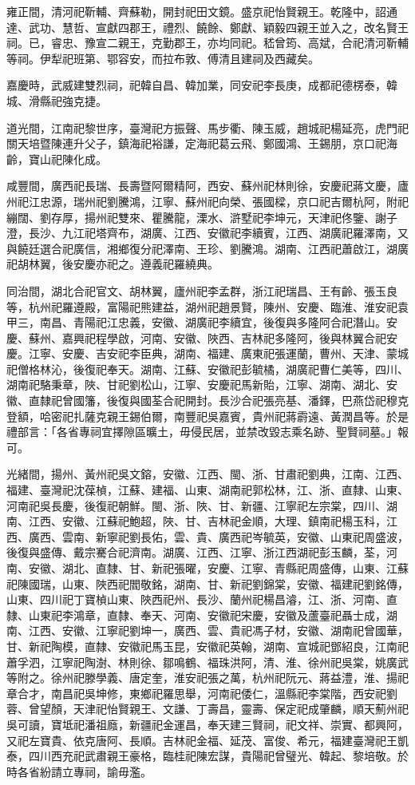 \begin{pinyinscope}
雍正間，清河祀靳輔、齊蘇勒，開封祀田文鏡。盛京祀怡賢親王。乾隆中，詔通達、武功、慧哲、宣獻四郡王，禮烈、饒餘、鄭獻、穎毅四親王並入之，改名賢王祠。已，睿忠、豫宣二親王，克勤郡王，亦均同祀。嵇曾筠、高斌，合祀清河靳輔等祠。伊犁祀班第、鄂容安，而拉布敦、傅清且建祠及西藏矣。

嘉慶時，武威建雙烈祠，祀韓自昌、韓加業，同安祀李長庚，成都祀德楞泰，韓城、滑縣祀強克捷。

道光間，江南祀黎世序，臺灣祀方振聲、馬步衢、陳玉威，趙城祀楊延亮，虎門祀關天培暨陳連升父子，鎮海祀裕謙，定海祀葛云飛、鄭國鴻、王錫朋，京口祀海齡，寶山祀陳化成。

咸豐間，廣西祀長瑞、長壽暨阿爾精阿，西安、蘇州祀林則徐，安慶祀蔣文慶，廬州祀江忠源，瑞州祀劉騰鴻，江寧、蘇州祀向榮、張國樑，京口祀吉爾杭阿，附祀繃闊、劉存厚，揚州祀雙來、瞿騰龍，溧水、滸墅祀李坤元，天津祀佟鑒、謝子澄，長沙、九江祀塔齊布，湖廣、江西、安徽祀李續賓，江西、湖廣祀羅澤南，又與饒廷選合祀廣信，湘鄉復分祀澤南、王珍、劉騰鴻。湖南、江西祀蕭啟江，湖廣祀胡林翼，後安慶亦祀之。遵義祀羅繞典。

同治間，湖北合祀官文、胡林翼，廬州祀李孟群，浙江祀瑞昌、王有齡、張玉良等，杭州祀羅遵殿，富陽祀熊建益，湖州祀趙景賢，陳州、安慶、臨淮、淮安祀袁甲三，南昌、青陽祀江忠義，安徽、湖廣祀李續宜，後復與多隆阿合祀潛山。安慶、蘇州、嘉興祀程學啟，河南、安徽、陜西、吉林祀多隆阿，後與林翼合祀安慶。江寧、安慶、吉安祀李臣典，湖南、福建、廣東祀張運蘭，曹州、天津、蒙城祀僧格林沁，後復祀奉天。湖南、江蘇、安徽祀彭毓橘，湖廣祀曹仁美等，四川、湖南祀駱秉章，陜、甘祀劉松山，江寧、安慶祀馬新貽，江寧、湖南、湖北、安徽、直隸祀曾國籓，後復與國荃合祀開封。長沙合祀張亮基、潘鐸，巴燕岱祀穆克登額，哈密祀扎薩克親王錫伯爾，南豐祀吳嘉賓，貴州祀蔣霨遠、黃潤昌等。於是禮部言：「各省專祠宜擇隙區曠土，毋侵民居，並禁改毀志乘名跡、聖賢祠墓。」報可。

光緒間，揚州、黃州祀吳文鎔，安徽、江西、閩、浙、甘肅祀劉典，江南、江西、福建、臺灣祀沈葆楨，江蘇、建福、山東、湖南祀郭松林，江、浙、直隸、山東、河南祀吳長慶，後復祀朝鮮。閩、浙、陜、甘、新疆、江寧祀左宗棠，四川、湖南、江西、安徽、江蘇祀鮑超，陜、甘、吉林祀金順，大理、鎮南祀楊玉科，江西、廣西、雲南、新寧祀劉長佑，雲、貴、廣西祀岑毓英，安徽、山東祀周盛波，後復與盛傳、戴宗騫合祀濟南。湖廣、江西、江寧、浙江西湖祀彭玉麟，荃，河南、安徽、湖北、直隸、甘、新祀張曜，安慶、江寧、青縣祀周盛傳，山東、江蘇祀陳國瑞，山東、陜西祀閻敬銘，湖南、甘、新祀劉錦棠，安徽、福建祀劉銘傳，山東、四川祀丁寶楨山東、陜西祀州、長沙、蘭州祀楊昌濬，江、浙、河南、直隸、山東祀李鴻章，直隸、奉天、河南、安徽祀宋慶，安徽及蘆臺祀聶士成，湖南、江西、安徽、江寧祀劉坤一，廣西、雲、貴祀馮子材，安徽、湖南祀曾國華，甘、新祀陶模，直隸、安徽祀馬玉昆，安徽祀英翰，湖南、宣城祀鄧紹良，江南祀蕭孚泗，江寧祀陶澍、林則徐、鄒鳴鶴、福珠洪阿，清、淮、徐州祀吳棠，姚廣武等附之。徐州祀滕學義、唐定奎，淮安祀張之萬，杭州祀阮元、蔣益澧，淮、揚祀章合才，南昌祀吳坤修，東鄉祀羅思舉，河南祀倭仁，溫縣祀李棠階，西安祀劉蓉、曾望顏，天津祀怡賢親王、文謙、丁壽昌，靈壽、保定祀成肇麟，順天薊州祀吳可讀，寶坻祀潘祖廕，新疆祀金運昌，奉天建三賢祠，祀文祥、崇實、都興阿，又祀左寶貴、依克唐阿、長順。吉林祀金福、延茂、富俊、希元，福建臺灣祀王凱泰，四川西充祀武肅親王豪格，臨桂祀陳宏謀，貴陽祀曾璧光、韓起、黎培敬。於時各省紛請立專祠，諭毋濫。


\end{pinyinscope}
